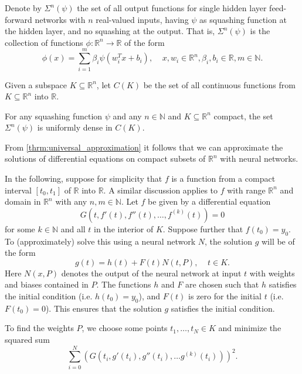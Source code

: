 Denote by $\Sigma^n(\psi)$ the set of all output functions for single hidden layer feed-forward networks with $n$ real-valued inputs, having $\psi$ as squashing function at the hidden layer, and no squashing at the output. That is, $\Sigma^n(\psi)$ is the collection of functions $\phi\colon\mathbb{R}^n\to\mathbb{R}$ of the form
\begin{equation*}
    \phi(x)=\sum_{i=1}^m\beta_i\psi(w^T_ix + b_i),\;\;\;\;x,w_i\in\mathbb{R}^n,\beta_i,b_i\in\mathbb{R},m\in\mathbb{N}.
\end{equation*}

Given a subspace $K\subseteq\mathbb{R}^n$, let $C(K)$ be the set of all continuous functions from $K\subseteq\mathbb{R}^n$ into $\mathbb{R}$.

\begin{theorem}\label{thrm:universal_approximation}
For any squashing function $\psi$ and any $n\in\mathbb{N}$ and $K\subseteq\mathbb{R}^n$ compact, the set $\Sigma^n(\psi)$ is uniformly dense in $C(K)$.
\end{theorem}

From \autoref{thrm:universal_approximation} it follows that we can approximate the solutions of differential equations on compact subsets of $\mathbb{R}^n$ with neural networks.

In the following, suppose for simplicity that $f$ is a function from a compact interval $[t_0,t_1]$ of $\mathbb{R}$ into $\mathbb{R}$. A similar discussion applies to $f$ with range $\mathbb{R}^n$ and domain in $\mathbb{R}^n$ with any $n,m\in\mathbb{N}$. Let $f$ be given by a differential equation
\begin{equation*}
    G(t,f'(t),f''(t),\ldots,f^{(k)}(t)) = 0
\end{equation*}
for some $k\in\mathbb{N}$ and all $t$ in the interior of $K$. Suppose further that $f(t_0)=y_0$. To (approximately) solve this using a neural network $N$, the solution $g$ will be of the form
\begin{equation*}
    g(t) = h(t) + F(t)N(t,P),\;\;\;\;t\in K.
\end{equation*}
Here $N(x,P)$ denotes the output of the neural network at input $t$ with weights and biases contained in $P$. The functions $h$ and $F$ are chosen such that $h$ satisfies the initial condition (i.e. $h(t_0)=y_0$), and $F(t)$ is zero for the initial $t$ (i.e. $F(t_0)=0$). This ensures that the solution $g$ satisfies the initial condition.

To find the weights $P$, we choose some points $t_1,\ldots,t_N\in K$ and minimize the squared sum
\begin{equation*}
    \sum_{i=0}^N(G(t_i,g'(t_i),g''(t_i),\ldots g^{(k)}(t_i)))^2.
\end{equation*}


